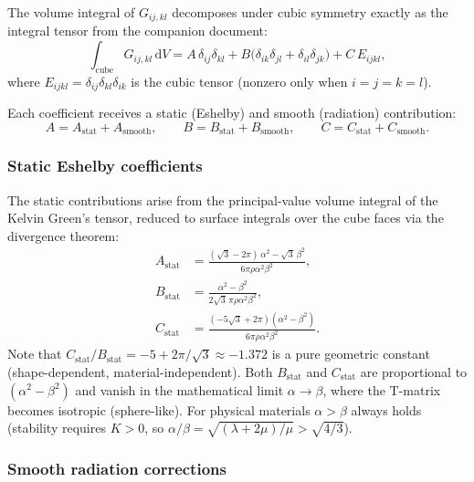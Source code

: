 \documentclass[11pt,a4paper]{article}
\newcommand{\dd}{\mathrm{d}}
\begin{document}
The volume integral of $G_{ij,kl}$ decomposes under cubic symmetry
exactly as the integral tensor from the companion document:
\begin{equation}
  \int_{\text{cube}} G_{ij,kl}\,\dd V
  = A\,\delta_{ij}\delta_{kl}
  + B\bigl(\delta_{ik}\delta_{jl} + \delta_{il}\delta_{jk}\bigr)
  + C\,E_{ijkl},
  \label{eq:Iself}
\end{equation}
where $E_{ijkl} = \delta_{ij}\delta_{kl}\delta_{ik}$ is the cubic
tensor (nonzero only when $i=j=k=l$).

Each coefficient receives a static (Eshelby) and smooth (radiation)
contribution:
\begin{equation}
  A = A_\text{stat} + A_\text{smooth}, \qquad
  B = B_\text{stat} + B_\text{smooth}, \qquad
  C = C_\text{stat} + C_\text{smooth}.
  \label{eq:ABC_split}
\end{equation}

\subsubsection*{Static Eshelby coefficients}

The static contributions arise from the principal-value volume
integral of the Kelvin Green's tensor, reduced to surface integrals
over the cube faces via the divergence theorem:
\begin{align}
  A_\text{stat} &=
  \frac{(\sqrt{3} - 2\pi)\,\alpha^2 - \sqrt{3}\,\beta^2}
       {6\pi\rho\alpha^2\beta^2},
  \label{eq:Astat} \\[6pt]
  B_\text{stat} &=
  \frac{\alpha^2 - \beta^2}
       {2\sqrt{3}\,\pi\rho\alpha^2\beta^2},
  \label{eq:Bstat} \\[6pt]
  C_\text{stat} &=
  \frac{(-5\sqrt{3} + 2\pi)(\alpha^2 - \beta^2)}
       {6\pi\rho\alpha^2\beta^2}.
  \label{eq:Cstat}
\end{align}
Note that $C_\text{stat}/B_\text{stat} = -5 + 2\pi/\sqrt{3}
\approx -1.372$ is a pure geometric constant (shape-dependent,
material-independent).  Both $B_\text{stat}$ and $C_\text{stat}$
are proportional to $(\alpha^2 - \beta^2)$ and vanish in the
mathematical limit $\alpha \to \beta$, where the T-matrix becomes
isotropic (sphere-like).  For physical materials $\alpha > \beta$
always holds (stability requires $K > 0$, so
$\alpha/\beta = \sqrt{(\lambda + 2\mu)/\mu} > \sqrt{4/3}$).

\subsubsection*{Smooth radiation corrections}
\end{document}
